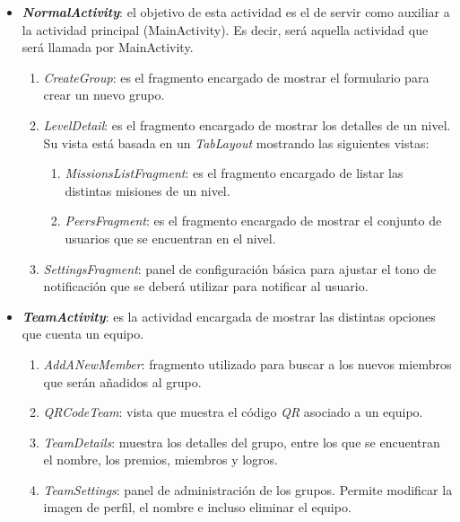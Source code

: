 \documentclass[twoside]{report}
\begin{document}
\begin{enumerate}
\begin{itemize}
	\item \textbf{\textit{NormalActivity}}: el objetivo de esta actividad es el de servir como auxiliar a la actividad principal (MainActivity). Es decir, será aquella actividad que será llamada por MainActivity.
	\begin{enumerate}
		\item \textit{CreateGroup}: es el fragmento encargado de mostrar el formulario para crear un nuevo grupo.
		\item \textit{LevelDetail}: es el fragmento encargado de mostrar los detalles de un nivel. Su vista está basada en un \textit{TabLayout} mostrando las siguientes vistas:
		\begin{enumerate}
		\item \textit{MissionsListFragment}: es el fragmento encargado de listar las distintas misiones de un nivel.
		\item \textit{PeersFragment}: es el fragmento encargado de mostrar el conjunto de usuarios que se encuentran en el nivel.
		\end{enumerate}
		\item \textit{SettingsFragment}: panel de configuración básica para ajustar el tono de notificación que se deberá utilizar para notificar al usuario.
	\end{enumerate}
	\item \textbf{\textit{TeamActivity}}: es la actividad encargada de mostrar las distintas opciones que cuenta un equipo.
		\begin{enumerate}
		\item \textit{AddANewMember}: fragmento utilizado para buscar a los nuevos miembros que serán añadidos al grupo.
		\item \textit{QRCodeTeam}: vista que muestra el código \textit{QR} asociado a un equipo.
		\item \textit{TeamDetails}: muestra los detalles del grupo, entre los que se encuentran el nombre, los premios, miembros y logros. 
		\item \textit{TeamSettings}: panel de administración de los grupos. Permite modificar la imagen de perfil, el nombre e incluso eliminar el equipo.
		\end{enumerate}
	\end{itemize}


\end{enumerate}
\end{document}

